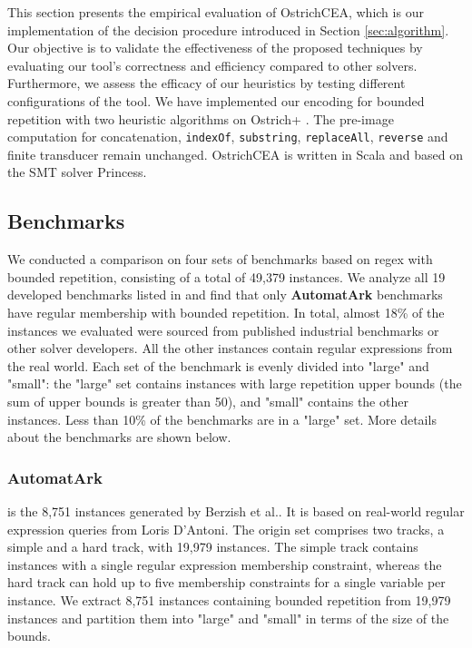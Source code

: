 %
This section presents the empirical evaluation of OstrichCEA, which is our implementation of the decision procedure introduced in Section \ref{sec:algorithm}. Our objective is to validate the effectiveness of the proposed techniques by evaluating our tool's correctness and efficiency compared to other solvers. Furthermore, we assess the efficacy of our heuristics by testing different configurations of the tool. We have implemented our encoding for bounded repetition with two heuristic algorithms on Ostrich+ \cite{atva2020}. The pre-image computation for concatenation, \verb|indexOf|, \verb|substring|, \verb|replaceAll|, \verb|reverse| and finite transducer remain unchanged. OstrichCEA is written in Scala and based on the SMT solver Princess\cite{princess}.
\subsection{Benchmarks}
We conducted a comparison on four sets of benchmarks based on regex with bounded repetition, consisting of a total of 49,379 instances. We analyze all 19 developed benchmarks listed in \cite{zaligvinder_2021} and find that only \textbf{AutomatArk} benchmarks have regular membership with bounded repetition. In total, almost 18\% of the instances we evaluated were sourced from published industrial benchmarks or other solver developers. All the other instances contain regular expressions from the real world. Each set of the benchmark is evenly divided into "large" and "small": the "large" set contains instances with large repetition upper bounds (the sum of upper bounds is greater than 50), and "small" contains the other instances. Less than 10\% of the benchmarks are in a "large" set. More details about the benchmarks are shown below.
\subsubsection{AutomatArk} is the 8,751 instances generated by Berzish et al.\cite{z3str3re}. It is based on real-world regular expression queries from Loris D'Antoni\cite{automatark}. The origin set comprises two tracks, a simple and a hard track, with 19,979 instances. The simple track contains instances with a single regular expression membership constraint, whereas the hard track can hold up to five membership constraints for a single variable per instance. We extract 8,751 instances containing bounded repetition from 19,979 instances and partition them into "large" and "small" in terms of the size of the bounds.
